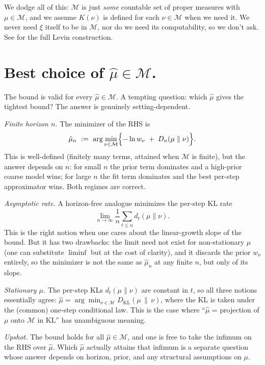 \documentclass[fontsize=11pt, parskip=half]{scrartcl}
\newcommand{\Mc}{\mathcal{M}}
\begin{document}
We dodge all of this: $\Mc$ is just \emph{some} countable set of proper measures with $\mu \in \Mc$, and we assume $K(\nu)$ is defined for each $\nu \in \Mc$ when we need it. We never need $\xi$ itself to be in $\Mc$, nor do we need its computability, so we don't ask. See \cite[\S2.4.3]{Hutter:04uaibook} for the full Levin construction.


\section{Best choice of $\hat{\mu} \in \Mc$.}\label{app:best_choice_mu}

The bound is valid for every $\hat\mu \in \Mc$. A tempting question: which
$\hat\mu$ gives the tightest bound? The answer is genuinely setting-dependent.

\textit{Finite horizon $n$.} The minimizer of the RHS is
\[
    \hat\mu_n ~:=~ \arg\min_{\nu \in \Mc}\Bigl\{ -\ln w_\nu \;+\; D_n(\mu \parallel \nu) \Bigr\}.
\]
This is well-defined (finitely many terms, attained when $\Mc$ is finite),
but the answer depends on $n$: for small $n$ the prior term dominates and a
high-prior coarse model wins; for large $n$ the fit term dominates and the best
per-step approximator wins. Both regimes are correct.

\textit{Asymptotic rate.} A horizon-free analogue minimizes the per-step KL
rate $$\lim_{n \to \infty} \frac{1}{n} \sum_{t \leq n} d_t(\mu \parallel \nu).$$ This is the right notion when one cares about the linear-growth slope of the bound. But it has two drawbacks: the limit need not exist for non-stationary $\mu$ (one can substitute $\liminf$ but at the cost of clarity), and it discards the prior $w_\nu$ entirely, so the minimizer is not the same as $\hat\mu_n$ at any finite $n$, but only of its slope.

\textit{Stationary $\mu$.} The per-step KLs $d_t(\mu \parallel \nu)$ are constant in $t$, so all three notions essentially agree: $\hat\mu = \arg\min_{\nu \in \Mc} D_{\text{KL}}(\mu \,\|\, \nu)$, where the KL is taken under the (common) one-step conditional law. This is the case where ``$\hat\mu$ = projection of $\mu$ onto $\Mc$ in KL'' has unambiguous meaning.

\textit{Upshot.} The bound holds for all $\hat\mu \in \Mc$, and one is free
to take the infimum on the RHS over $\hat\mu$. Which $\hat\mu$ actually
attains that infimum is a separate question whose answer depends on horizon,
prior, and any structural assumptions on $\mu$.



\end{document}
